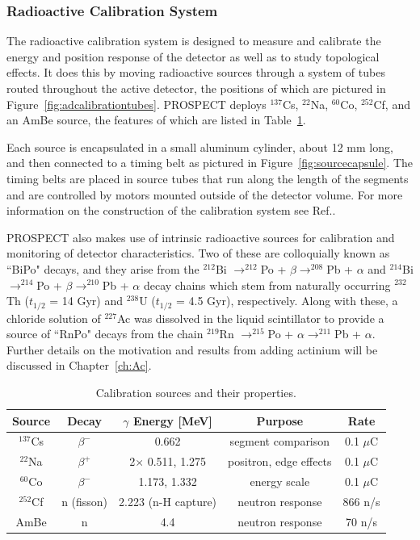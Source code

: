 \subsubsection{Radioactive Calibration System}

The radioactive calibration system is designed to measure and calibrate the energy and position response of the detector as well as to study topological effects. 
It does this by moving radioactive sources through a system of tubes routed throughout the active detector, the positions of which are pictured in Figure~\ref{fig:adcalibrationtubes}.
PROSPECT deploys $^{137}$Cs, $^{22}$Na, $^{60}$Co, $^{252}$Cf, and an AmBe source, the features of which are listed in Table~\ref{tab:Sources}.

Each source is encapsulated in a small aluminum cylinder, about 12 mm long, and then connected to a timing belt as pictured in Figure~\ref{fig:sourcecapsule}.
The timing belts are placed in source tubes that run along the length of the segments and are controlled by motors mounted outside of the detector volume. 
For more information on the construction of the calibration system see Ref.\cite{Ashenfelter:2019jzp}.

PROSPECT also makes use of intrinsic radioactive sources for calibration and monitoring of detector characteristics. 
Two of these are colloquially known as ``BiPo" decays, and they arise from the $^{212}$Bi $\rightarrow ^{212}$Po + $\beta \rightarrow ^{208}$Pb + $\alpha$ and $^{214}$Bi $\rightarrow ^{214}$Po + $\beta \rightarrow ^{210}$Pb + $\alpha$ decay chains which stem from naturally occurring $^{232}$Th ($t_{1/2}$ = 14 Gyr) and $^{238}$U ($t_{1/2}$ = 4.5 Gyr), respectively.
Along with these, a chloride solution of $^{227}$Ac was dissolved in the liquid scintillator to provide a source of ``RnPo" decays from the chain $^{219}$Rn $\rightarrow ^{215}$Po + $\alpha \rightarrow ^{211}$Pb + $\alpha$.
Further details on the motivation and results from adding actinium will be discussed in Chapter~\ref{ch:Ac}.


\begin{table}[t]
\begin{tabular}{|c|c|c|c|c|}
	\hline 
	\bf{Source} & \bf{Decay} & \bf{$\gamma$ Energy [MeV]} & Purpose & Rate \\ 
	\hline 
	$^{137}$Cs & $\beta^-$ & 0.662 & segment comparison & 0.1 $\mu$C \\ 
	\hline 
	$^{22}$Na & $\beta^+$ & 2$\times$ 0.511, 1.275 & positron, edge effects & 0.1 $\mu$C \\ 
	\hline 
	$^{60}$Co & $\beta^-$ & 1.173, 1.332 & energy scale & 0.1 $\mu$C \\ 
	\hline 
	$^{252}$Cf & n (fisson) & 2.223 (n-H capture) & neutron response & 866 n/s \\ 
	\hline 
	AmBe & n & 4.4 & neutron response & 70 n/s \\ 
	\hline 
\end{tabular} 
\caption[Calibration sources]{Calibration sources and their properties.}
\label{tab:Sources}
\end{table}

